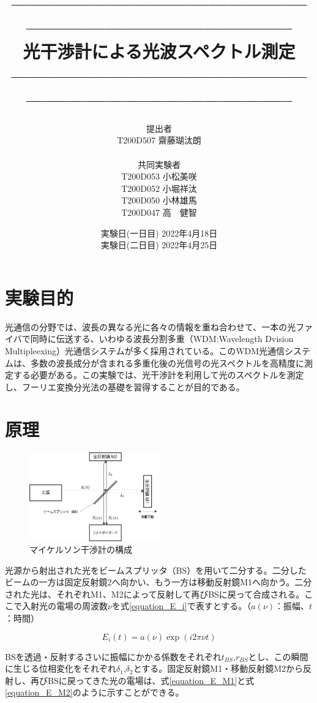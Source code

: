 \documentclass[uplatex, titlepage, fontsize=10pt, paper=a4paper]{jsarticle}
\title{
\vspace{-5cm}
--------------------------------------------------------------------------------------\\
\vspace{8mm}
{\Huge 光干渉計による光波スペクトル測定}\\
\vspace{6mm}
--------------------------------------------------------------------------------------}
\author{\Large
    \vspace{2mm}
    提出者\\
    \large
    \vspace{2mm}
    T200D507 齋藤瑚汰朗\\\\
    \Large
    \vspace{2mm}
    共同実験者\\
    \large
    \vspace{2mm}
    T200D053 小松美咲\\
    \large
    \vspace{2mm}
    T200D052 小堀祥汰\\
    \large
    \vspace{2mm}
    T200D050 小林雄馬\\
    \large
    T200D047 高　健智
    \vspace{5mm}
}
\date{\Large
    実験日(一日目) 2022年4月18日\\
    \Large
    \vspace{2mm}
    実験日(二日目) 2022年4月25日
}
\numberwithin{equation}{section}
\begin{document}
\maketitle

\newpage

\section{実験目的}
光通信の分野では、波長の異なる光に各々の情報を重ね合わせて、一本の光ファイバで同時に伝送する、いわゆる波長分割多重（WDM:Wavelength Dvision Multipleexing）光通信システムが多く採用されている。このWDM光通信システムは、多数の波長成分が含まれる多重化後の光信号の光スペクトルを高精度に測定する必要がある。この実験では、光干渉計を利用して光のスペクトルを測定し、フーリエ変換分光法の基礎を習得することが目的である。

\section{原理}

\begin{figure}
    \centering
    \includegraphics[width = 0.5\textwidth]{画像フォルダ/Interferometer.png}
    \caption{マイケルソン干渉計の構成}
    \label{Michelson_interferometer}
\end{figure}

光源から射出された光をビームスプリッタ（BS）を用いて二分する。二分したビームの一方は固定反射鏡2へ向かい、もう一方は移動反射鏡M1へ向かう。二分された光は、それぞれM1、M2によって反射して再びBSに戻って合成される。ここで入射光の電場の周波数$\nu$を式\ref{equation_E_i}で表すとする。（$a(\nu)$：振幅、$t$：時間）

\begin{equation}
    E_{i}(t) = a(\nu)\exp(i2{\pi\nu}t)
    \label{equation_E_i}
\end{equation}

BSを透過・反射するさいに振幅にかかる係数をそれぞれ$t_{BS}$,$r_{BS}$とし、この瞬間に生じる位相変化をそれぞれ$\delta_{1}$,$\delta_{2}$とする。固定反射鏡M1・移動反射鏡M2から反射し、再びBSに戻ってきた光の電場は、式\ref{equation_E_M1}と式\ref{equation_E_M2}のように示すことができる。
\end{document}
